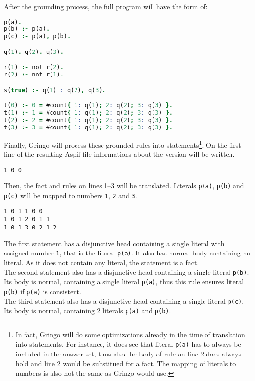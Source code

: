 \begin{example}
    After the grounding process, the full program will have the form of:
    \begin{lstlisting}[language=prolog]
p(a).
p(b) :- p(a).
p(c) :- p(a), p(b).

q(1). q(2). q(3).

r(1) :- not r(2).
r(2) :- not r(1).

s(true) :- q(1) : q(2), q(3).

t(0) :- 0 = #count{ 1: q(1); 2: q(2); 3: q(3) }.
t(1) :- 1 = #count{ 1: q(1); 2: q(2); 3: q(3) }.
t(2) :- 2 = #count{ 1: q(1); 2: q(2); 3: q(3) }.
t(3) :- 3 = #count{ 1: q(1); 2: q(2); 3: q(3) }.
\end{lstlisting}

    Finally, Gringo will process these grounded rules into statements\footnote{
        In fact, Gringo will do some optimizations already in the time of
    translation into statements. For instance, it does see that literal \texttt{p(a)}
    has to always be included in the answer set, thus also the body of rule on line 2
    does always hold and line 2 would be substitued for a fact.
    The mapping of literals to numbers is also not the same as Gringo would use.}.
    On the first line of the resulting Aspif file informations about the version
    will be written.
    \begin{lstlisting}
1 0 0
\end{lstlisting}

    Then, the fact and rules on lines 1--3 will be translated. Literals
    \texttt{p(a)}, \texttt{p(b)} and \texttt{p(c)} will be mapped to numbers \texttt{1},
    \texttt{2} and \texttt{3}.
    \begin{lstlisting}[firstnumber=2]
1 0 1 1 0 0
1 0 1 2 0 1 1
1 0 1 3 0 2 1 2
\end{lstlisting}
    The first statement has a disjunctive head containing a single literal with assigned
    number \texttt{1}, that is the literal \texttt{p(a)}. It also has normal body
    containing no literal. As it does not contain any literal, the statement is a fact.\\
    The second statement also has a disjunctive head containing a single literal
    \texttt{p(b)}. Its body is normal, containing a single literal \texttt{p(a)},
    thus this rule ensures literal \texttt{p(b)} if \texttt{p(a)} is consistent.\\
    The third statement also has a disjunctive head containing a single literal
    \texttt{p(c)}. Its body is normal, containing 2 literals \texttt{p(a)} and \texttt{p(b)}.


\end{example}
